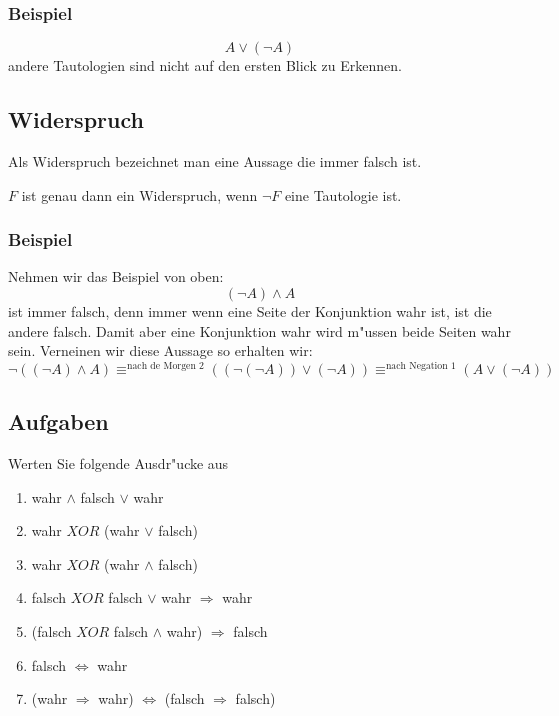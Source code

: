 \subsubsection*{Beispiel}
\begin{equation*}
A \lor (\neg A)
\end{equation*}
andere Tautologien sind nicht auf den ersten Blick zu Erkennen.

\subsection{Widerspruch}
Als Widerspruch bezeichnet man eine Aussage die immer falsch ist. 
\begin{axiom}[Widerspruch]
$F$ ist genau dann ein Widerspruch, wenn $\neg F$ eine Tautologie ist.
\end{axiom}

\subsubsection*{Beispiel}
Nehmen wir das Beispiel von oben:
\begin{equation*}
(\neg A) \land A
\end{equation*}
ist immer falsch, denn immer wenn eine Seite der Konjunktion wahr ist, ist die andere falsch. Damit aber eine Konjunktion wahr wird m"ussen beide Seiten wahr sein. Verneinen wir diese Aussage so erhalten wir:
\begin{equation*}
\neg ((\neg A) \land A) \equiv^{\text{nach de Morgen 2}} ((\neg (\neg A)) \lor (\neg A)) \equiv^{\text{nach Negation 1}} (A \lor (\neg A))
\end{equation*} 

\subsection{Aufgaben}
Werten Sie folgende Ausdr"ucke aus
\begin{enumerate}
	\item wahr $\land$ falsch $\lor$ wahr
	\item wahr $XOR$ (wahr $\lor$ falsch)
	\item wahr $XOR$ (wahr $\land$ falsch)
	\item falsch $XOR$ falsch $\lor$ wahr $\Rightarrow$ wahr
	\item (falsch $XOR$ falsch $\land$ wahr) $\Rightarrow$ falsch
	\item falsch $\iff$ wahr
	\item (wahr $\Rightarrow$ wahr) $\iff$ (falsch $\Rightarrow$ falsch)
\end{enumerate}

